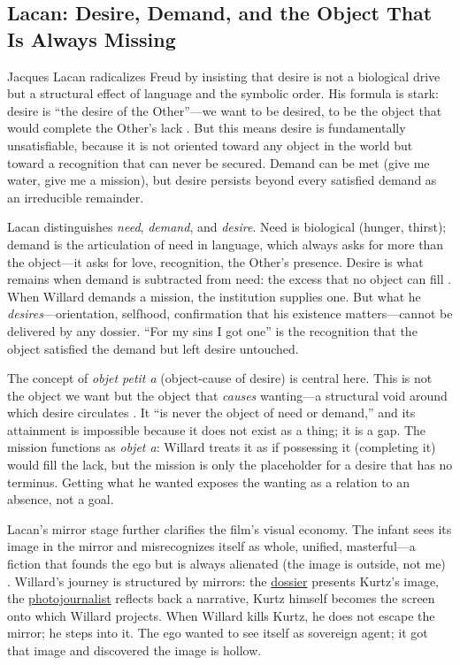 \subsection*{Lacan: Desire, Demand, and the Object That Is Always Missing}
\label{ssec:vi-lacan}

Jacques Lacan radicalizes Freud by insisting that desire is not a biological drive but a
structural effect of language and the symbolic order. His formula is stark: desire is ``the
desire of the Other''---we want to be desired, to be the object that would complete the
Other's lack \parencite{LacanEcrits2006}. But this means desire is fundamentally
unsatisfiable, because it is not oriented toward any object in the world but toward a
recognition that can never be secured. Demand can be met (give me water, give me a mission),
but desire persists beyond every satisfied demand as an irreducible remainder.

Lacan distinguishes \emph{need}, \emph{demand}, and \emph{desire}. Need is biological (hunger,
thirst); demand is the articulation of need in language, which always asks for more than the
object---it asks for love, recognition, the Other's presence. Desire is what remains when
demand is subtracted from need: the excess that no object can fill
\parencite{LacanEcrits2006}. When Willard demands a mission, the institution supplies one. But
what he \emph{desires}---orientation, selfhood, confirmation that his existence
matters---cannot be delivered by any dossier. ``For my sins I got one'' is the recognition
that the object satisfied the demand but left desire untouched.

The concept of \emph{objet petit a} (object-cause of desire) is central here. This is not the
object we want but the object that \emph{causes} wanting---a structural void around which
desire circulates \parencite[p.~103]{LacanSeminarXI1991}. It ``is never the object of need or
demand,'' and its attainment is impossible because it does not exist as a thing; it is a gap.
The mission functions as \emph{objet a}: Willard treats it as if possessing it (completing it)
would fill the lack, but the mission is only the placeholder for a desire that has no
terminus. Getting what he wanted exposes the wanting as a relation to an absence, not a goal.

Lacan's mirror stage further clarifies the film's visual economy. The infant sees its image in
the mirror and misrecognizes itself as whole, unified, masterful---a fiction that founds the
ego but is always alienated (the image is outside, not me) \parencite{LacanEcrits2006}.
Willard's journey is structured by mirrors: the \hyperref[scene:briefing]{dossier} presents
Kurtz's image, the \hyperref[scene:kurtz-compound]{photojournalist} reflects back a narrative,
Kurtz himself becomes the screen onto which Willard projects. When Willard kills Kurtz, he
does not escape the mirror; he steps into it. The ego wanted to see itself as sovereign agent;
it got that image and discovered the image is hollow.

